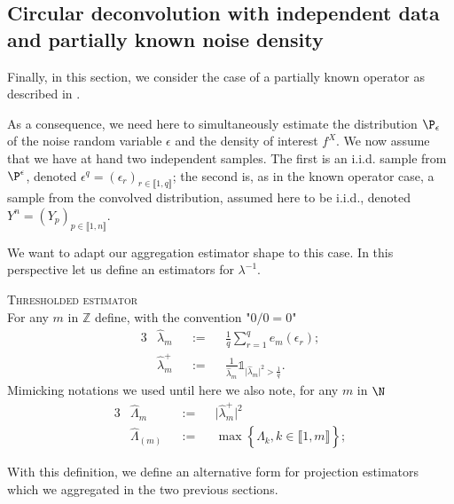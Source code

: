 \subsection{Circular deconvolution with independent data and partially known noise density}\label{FREQ_CIRCDECONV_UNKNOWN_IID}

Finally, in this section, we consider the case of a partially known operator as described in .

As a consequence, we need here to simultaneously estimate the distribution $\P_{\epsilon}$ of the noise random variable $\epsilon$ and the density of interest $f^{X}$.
We now assume that we have at hand two independent samples.
The first is an i.i.d. sample from $\P^{\epsilon}$, denoted $\epsilon^{q} = \left(\epsilon_{r}\right)_{r \in \llbracket 1, q \rrbracket}$; the second is, as in the known operator case, a sample from the convolved distribution, assumed here to be i.i.d., denoted $Y^{n} = \left(Y_{p}\right)_{p \in \llbracket 1, n \rrbracket}$.

\medskip

We want to adapt our aggregation estimator shape to this case. In this perspective let us define an estimators for $\lambda^{-1}$.

\begin{de}{\textsc{Thresholded estimator} \\}\label{DE_FREQ_CIRCDECONV_UNKNOWN_IID_THRESHOLDEDEST}
For any $m$ in $\mathds{Z}$ define, with the convention "$0/0 = 0$"
\begin{alignat*}{3}
& \widehat{\lambda}_{m} && := && \frac{1}{q} \sum\limits_{r = 1}^{q} e_{m}(\epsilon_{r});\\
& \widehat{\lambda}^{+}_{m} && := && \frac{1}{\widehat{\lambda}_{m}} \mathds{1}_{\vert \widehat{\lambda}_{m}\vert^{2} > \frac{1}{q}}.
\end{alignat*}
Mimicking notations we used until here we also note, for any $m$ in $\N$
\begin{alignat*}{3}
& \widehat{\Lambda}_{m} && := && \vert \widehat{\lambda}^{+}_{m} \vert^{2}\\
& \widehat{\Lambda}_{(m)} && := && \max\left\{\widehat{\Lambda}_{k}, k \in \llbracket 1, m \rrbracket \right\};
\end{alignat*}
\end{de}

With this definition, we define an alternative form for projection estimators which we aggregated in the two previous sections.

